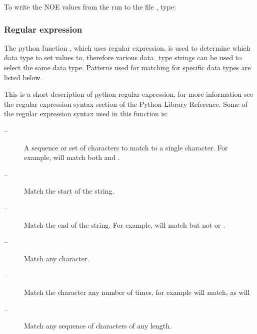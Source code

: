 

 To write the NOE values from the run  to the file , type: 
  





  
 \subsubsection{Regular expression} 

 The python function , which uses regular expression, is used to determine which data type to set values to, therefore various data\_type strings can be used to select the same data type.  Patterns used for matching for specific data types are listed below. 
  

 This is a short description of python regular expression, for more information see the regular expression syntax section of the Python Library Reference.  Some of the regular expression syntax used in this function is: 
  

 \begin{description} 
 \item[\quotecmd{[]} --]  A sequence or set of characters to match to a single character.  For example,  will match both  and .  
 \item[\quotecmd{\^{}} --]  Match the start of the string.  
 \item[\quotecmd{\$} --]  Match the end of the string.  For example,  will match  but not  or .  
 \item[ --]  Match any character.  
 \item[ --]  Match the character  any number of times, for example  will match, as will   
 \item[ --]  Match any sequence of characters of any length.  
 \end{description} 
  

